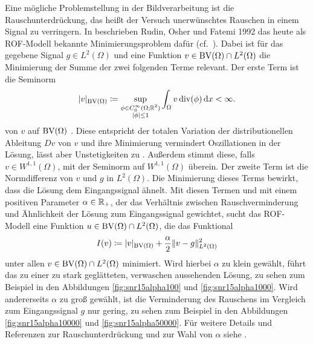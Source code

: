 Eine mögliche Problemstellung in der Bildverarbeitung ist die 
Rauschunterdrü\-ckung, das heißt der Versuch unerwünschtes Rauschen in einem
Signal zu verringern.
In \cite{ROF92} beschrieben Rudin, Osher und Fatemi 1992 das heute als
ROF-Modell bekannte Minimierungsproblem dafür (cf.\
\cites[1217]{Bar15a}[132]{CP10}[S. 74 f.]{Get12}).
Dabei ist für das gegebene Signal $g\in L^2(\Omega)$ und 
eine Funktion $v\in\textup{BV}(\Omega)\cap L^2(\Omega)$ die Minimierung
der Summe der zwei folgenden Terme relevant.
Der erste Term ist die
Seminorm
\begin{align*}
  |v|_{\textup{BV}(\Omega)}
  \coloneqq
  \sup_{\substack{\phi\in C^\infty_0(\Omega;\mathbb{R}^2)\\
  |\phi|\leq 1}}\int_\Omega v\operatorname{div} (\phi)\,\mathrm{d}x
  <
  \infty.
\end{align*}
von $v$ auf $\textup{BV}(\Omega)$ \cite[1162]{Bar12}. Diese entspricht der
totalen Variation der distributionellen Ableitung $Dv$ von $v$ und
ihre Minimierung vermindert Oszillationen in der Lösung, lässt aber
Unstetigkeiten zu \cite[75]{Get12}.
Außerdem stimmt diese, falls $v\in W^{1,1}(\Omega)$, mit der Seminorm auf
$W^{1,1}(\Omega)$ überein. 
Der zweite Term ist die Normdifferenz von $v$ und $g$ in $L^2(\Omega)$. 
Die Minimierung dieses Terms bewirkt, dass die Lösung dem Eingangssignal
ähnelt.
Mit diesen Termen und mit einem positiven Parameter
$\alpha\in\mathbb{R}_+$, der das Verhältnis zwischen Rauschverminderung und
Ähnlichkeit der Lösung zum Eingangssignal gewichtet, sucht das ROF-Modell
eine Funktion $u\in\textup{BV}(\Omega)\cap L^2(\Omega)$, die das Funktional
\begin{align}
  \label{eq:rofModel}
  I(v)\coloneqq |v|_{\textup{BV}(\Omega)}+\frac{\alpha}{2}\Vert
  v-g\Vert_{L^2(\Omega)}^2
\end{align}
unter allen $v\in\textup{BV}(\Omega)\cap L^2(\Omega)$ minimiert.
Wird hierbei $\alpha$ zu klein gewählt, führt das zu einer zu stark
geglätteten, verwaschen aussehenden Lösung, zu sehen zum Beispiel in den
Abbildungen \ref{fig:snr15alpha100} und \ref{fig:snr15alpha1000}. 
Wird andererseits $\alpha$ zu groß gewählt, ist die Verminderung des Rauschens
im Vergleich zum Eingangssignal $g$ nur gering, zu sehen zum Beispiel in den
Abbildungen \ref{fig:snr15alpha10000} und \ref{fig:snr15alpha50000}.
Für weitere Details und Referenzen zur Rauschunterdrückung und zur Wahl von
$\alpha$ siehe \cite{Get12}.

